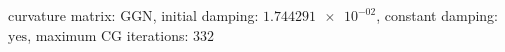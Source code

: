 curvature matrix: $\text{GGN}$, initial damping: $\num[scientific-notation=true]{1.744291e-02}$, constant damping: $\text{yes}$, maximum CG iterations: $\num[scientific-notation=false]{332}$